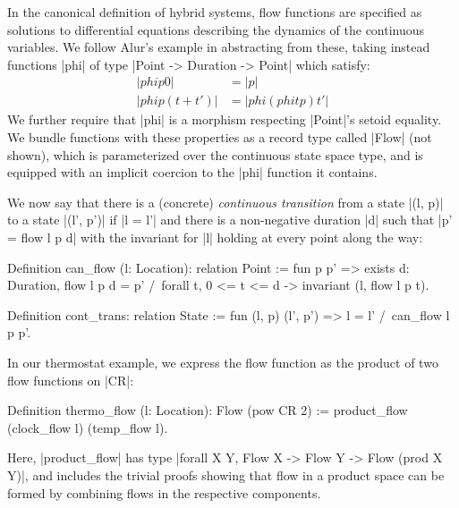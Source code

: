 \documentclass[runningheads]{llncs}
\begin{document}

In the canonical definition of hybrid systems, flow functions are specified as solutions to differential equations describing the dynamics of the continuous variables. We follow Alur's example in abstracting from these, taking instead functions |phi| of type |Point -> Duration -> Point| which satisfy:
\begin{align*}
  |phi p 0| &= |p| \\
  |phi p (t + t')| &= |phi (phi t p) t'|
\end{align*}
We further require that |phi| is a morphism respecting |Point|'s setoid equality. We bundle functions with these properties as a record type called |Flow| (not shown), which is parameterized over the continuous state space type, and is equipped with an implicit coercion to the |phi| function it contains.


We now say that there is a (concrete) \emph{continuous transition} from a state |(l, p)| to a state |(l', p')| if |l = l'| and there is a non-negative duration |d| such that |p' = flow l p d| with the invariant for |l| holding at every point along the way:

\begin{code}
  Definition can_flow (l: Location): relation Point
    := fun p p' => exists d: Duration, flow l p d = p' /\
      forall t, 0 <= t <= d -> invariant (l, flow l p t).

  Definition cont_trans: relation State
    := fun (l, p) (l', p') => l = l' /\ can_flow l p p'.
\end{code}

In our thermostat example, we express the flow function as the product of two flow functions on |CR|:

\begin{code}
  Definition thermo_flow (l: Location): Flow (pow CR 2)
    := product_flow (clock_flow l) (temp_flow l).
\end{code}
Here, |product_flow| has type |forall X Y, Flow X -> Flow Y -> Flow (prod X Y)|, and includes the trivial proofs showing that flow in a product space can be formed by combining flows in the respective components.
\end{document}
